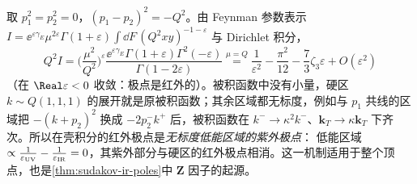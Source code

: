 \begin{example}[在壳无质量形状因子 = 硬区]\label{ex:sudakov-onshell-hard}
取 $p_1^2=p_2^2=0$，$(p_1-p_2)^2=-Q^2$。由 Feynman 参数表示 $I=\ee^{\varepsilon\gamma_E}\mu^{2\varepsilon}\Gamma(1+\varepsilon)\int\!\dd F\,(Q^2xy)^{-1-\varepsilon}$ 与 Dirichlet 积分，
\begin{equation}\label{eq:sudakov-onshell-H}
Q^2I=\Big(\frac{\mu^2}{Q^2}\Big)^{\varepsilon}\frac{\ee^{\varepsilon\gamma_E}\Gamma(1+\varepsilon)\Gamma^2(-\varepsilon)}{\Gamma(1-2\varepsilon)}
\overset{\mu=Q}{=}\frac1{\varepsilon^2}-\frac{\pi^2}{12}-\frac73\zeta_3\varepsilon+O(\varepsilon^2)
\end{equation}
（在 $\Real\varepsilon<0$ 收敛：极点是红外的）。被积函数中没有小量，硬区 $k\sim Q(1,1,1)$ 的展开就是原被积函数；其余区域都无标度，例如与 $p_1$ 共线的区域把
$-(k+p_2)^2$ 换成 $-2p_2^-k^+$ 后，被积函数在 $k^-\to\kappa^2k^-$、$\mathbf k_T\to\kappa\mathbf k_T$ 下齐次。所以在壳积分的红外极点是\emph{无标度低能区域的紫外极点}：
低能区域 $\propto\frac1{\varepsilon_{\rm UV}}-\frac1{\varepsilon_{\rm IR}}=0$，其紫外部分与硬区的红外极点相消。这一机制适用于整个顶点，也是\cref{thm:sudakov-ir-poles}中 $\mathbf Z$ 因子的起源。
\end{example}

